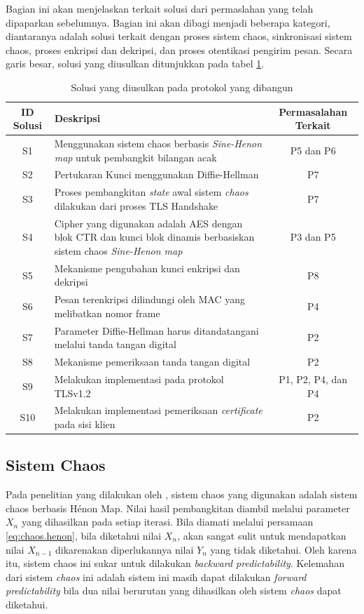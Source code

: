 Bagian ini akan menjelaskan terkait solusi dari permaslahan yang telah dipaparkan sebelumnya. Bagian ini akan dibagi menjadi beberapa kategori, diantaranya adalah solusi terkait dengan proses sistem chaos, sinkronisasi sistem chaos, proses enkripsi dan dekripsi, dan proses otentikasi pengirim pesan. Secara garis besar, solusi yang diusulkan ditunjukkan pada tabel \ref{tab:solusi}.

\begin{table}[!h]
  \centering
  \caption{Solusi yang diusulkan pada protokol yang dibangun} \label{tab:solusi}
  \begin{tabular}{|c|p{6cm}|c|}
    \hline
    ID Solusi & Deskripsi & Permasalahan Terkait \\
    \hline
    S1 & Menggunakan sistem chaos berbasis \emph{Sine-Henon map} untuk pembangkit bilangan acak & P5 dan P6 \\ \hline
    S2 & Pertukaran Kunci menggunakan Diffie-Hellman & P7 \\ \hline
    S3 & Proses pembangkitan \emph{state} awal sistem \emph{chaos} dilakukan dari proses TLS Handshake & P7 \\ \hline
    S4 & Cipher yang digunakan adalah AES dengan blok CTR dan kunci blok dinamis berbasiskan sistem chaos \emph{Sine-Henon map} & P3 dan P5 \\ \hline
    S5 & Mekanisme pengubahan kunci enkripsi dan dekripsi & P8 \\ \hline
    S6 & Pesan terenkripsi dilindungi oleh MAC yang melibatkan nomor frame & P4 \\ \hline
    S7 & Parameter Diffie-Hellman harus ditandatangani melalui tanda tangan digital & P2 \\ \hline
    S8 & Mekanisme pemeriksaan tanda tangan digital & P2 \\ \hline
    S9 & Melakukan implementasi pada protokol TLSv1.2 & P1, P2, P4, dan P4 \\ \hline
    S10 & Melakukan implementasi pemeriksaan \emph{certificate} pada sisi klien & P2 \\ \hline
  \end{tabular}
\end{table}

\subsection{Sistem Chaos}

Pada penelitian yang dilakukan oleh \textcite{lin2021}, sistem chaos yang digunakan adalah sistem chaos berbasis Hénon Map. Nilai hasil pembangkitan diambil melalui parameter $X_n$ yang dihasilkan pada setiap iterasi. Bila diamati melalui persamaan \ref{eq:chaos.henon}, bila diketahui nilai $X_n$, akan sangat sulit untuk mendapatkan nilai $X_{n-1}$ dikarenakan diperlukannya nilai $Y_n$ yang tidak diketahui. Oleh karena itu, sistem chaos ini sukar untuk dilakukan \emph{backward predictability}. Kelemahan dari sistem \emph{chaos} ini adalah sistem ini masih dapat dilakukan \emph{forward predictability} bila dua nilai berurutan yang dihasilkan oleh sistem \emph{chaos} dapat diketahui. 

